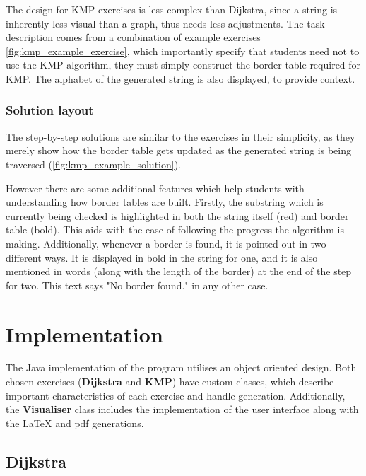 \documentclass{l4proj}
\begin{document}
The design for KMP exercises is less complex than Dijkstra, since a string is inherently less visual than a graph, thus needs less adjustments. The task description comes from a combination of example exercises  \autoref{fig:kmp_example_exercise}, which importantly specify that students need not to use the KMP algorithm, they must simply construct the border table required for KMP. The alphabet of the generated string is also displayed, to provide context.

\subsection{Solution layout}
\label{sec:KMPSolutionDesign}

The step-by-step solutions are similar to the exercises in their simplicity, as they merely show how the border table gets updated as the generated string is being traversed (\autoref{fig:kmp_example_solution}).

However there are some additional features which help students with understanding how border tables are built. Firstly, the substring which is currently being checked is highlighted in both the string itself (red) and border table (bold). This aids with the ease of following the progress the algorithm is making. Additionally, whenever a border is found, it is pointed out in two different ways. It is displayed in bold in the string for one, and it is also mentioned in words (along with the length of the border) at the end of the step for two. This text says "No border found." in any other case.

\chapter{Implementation}
\label{chap:imp}

The Java implementation of the program utilises an object oriented design. Both chosen exercises (\textbf{Dijkstra} and \textbf{KMP}) have custom classes, which describe important characteristics of each exercise and handle generation. Additionally, the \textbf{Visualiser} class includes the implementation of the user interface along with the LaTeX and pdf generations.

\section{Dijkstra}
\end{document}
